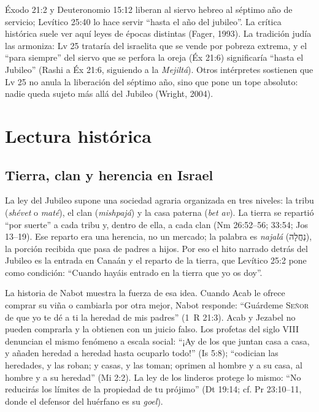 \documentclass[11pt,letterpaper]{article}
\newcommand{\heb}[1]{\mbox{\foreignlanguage{hebrew}{#1}}}
\newcommand{\SENOR}{\textsc{Señor}}
\begin{document}
\begin{nota}
Éxodo 21:2 y Deuteronomio 15:12 liberan al siervo hebreo al séptimo año de servicio; Levítico 25:40 lo hace servir ``hasta el año del jubileo''. La crítica histórica suele ver aquí leyes de épocas distintas (Fager, 1993). La tradición judía las armoniza: Lv 25 trataría del israelita que se vende por pobreza extrema, y el ``para siempre'' del siervo que se perfora la oreja (Éx 21:6) significaría ``hasta el Jubileo'' (Rashi a Éx 21:6, siguiendo a la \emph{Mejiltá}). Otros intérpretes sostienen que Lv 25 no anula la liberación del séptimo año, sino que pone un tope absoluto: nadie queda sujeto más allá del Jubileo (Wright, 2004).
\end{nota}

\section{Lectura histórica}

\subsection{Tierra, clan y herencia en Israel}
La ley del Jubileo supone una sociedad agraria organizada en tres niveles: la tribu (\emph{shévet} o \emph{maté}), el clan (\emph{mishpajá}) y la casa paterna (\emph{bet av}). La tierra se repartió ``por suerte'' a cada tribu y, dentro de ella, a cada clan (Nm 26:52--56; 33:54; Jos 13--19). Ese reparto era una herencia, no un mercado; la palabra es \emph{najalá} (\heb{נַחֲלָה}), la porción recibida que pasa de padres a hijos. Por eso el hito narrado detrás del Jubileo es la entrada en Canaán y el reparto de la tierra, que Levítico 25:2 pone como condición: ``Cuando hayáis entrado en la tierra que yo os doy''.

La historia de Nabot muestra la fuerza de esa idea. Cuando Acab le ofrece comprar su viña o cambiarla por otra mejor, Nabot responde: ``Guárdeme \SENOR{} de que yo te dé a ti la heredad de mis padres'' (1~R 21:3). Acab y Jezabel no pueden comprarla y la obtienen con un juicio falso. Los profetas del siglo VIII denuncian el mismo fenómeno a escala social: ``¡Ay de los que juntan casa a casa, y añaden heredad a heredad hasta ocuparlo todo!'' (Is 5:8); ``codician las heredades, y las roban; y casas, y las toman; oprimen al hombre y a su casa, al hombre y a su heredad'' (Mi 2:2). La ley de los linderos protege lo mismo: ``No reducirás los límites de la propiedad de tu prójimo'' (Dt 19:14; cf. Pr 23:10--11, donde el defensor del huérfano es su \emph{goel}).
\end{document}
